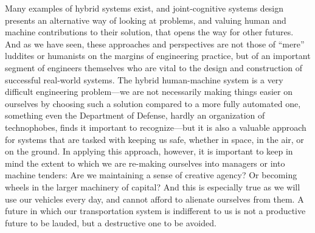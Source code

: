 Many examples of hybrid systems exist, and joint-cognitive systems
design presents an alternative way of looking at problems, and valuing
human and machine contributions to their solution, that opens the way
for other futures. And as we have seen, these approaches and
perspectives are not those of ``mere'' luddites or humanists on the
margins of engineering practice, but of an important segment of
engineers themselves who are vital to the design and construction of
successful real-world systems. The hybrid human-machine system is a
very difficult engineering problem---we are not necessarily making
things easier on ourselves by choosing such a solution compared to a
more fully automated one, something even the Department of Defense,
hardly an organization of technophobes, finds it important to recognize---but
it is also a valuable approach for 
systems that are tasked with keeping us safe, whether in space, in the
air, or on the ground. In applying this approach, however, it is
important to keep in mind the extent to which we are re-making
ourselves into managers or into machine tenders:  Are we maintaining a sense of
creative agency? Or becoming wheels in the larger machinery of capital? And
this is especially true as we will use our 
vehicles every day, and cannot afford to alienate ourselves from them.
A future in which our transportation system is indifferent to us is
not a productive future to be lauded, but a destructive one to be
avoided. 

